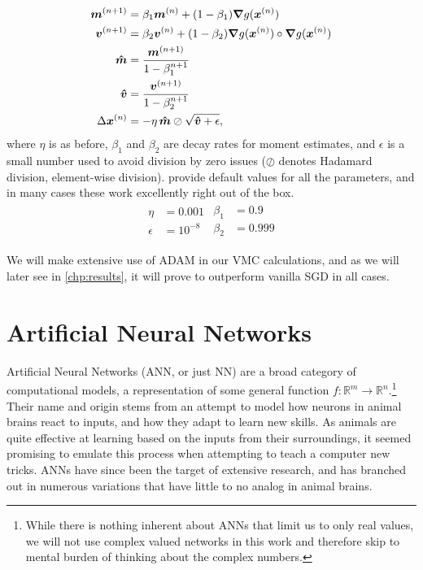 \documentclass[Thesis.tex]{subfiles}
\begin{document}
\begin{align}
  \bm{m}^{(n+1)} &= \beta_1 \bm{m}^{(n)} + (1 - \beta_1)\grad{g(\bm{x}^{(n)})}\\
  \bm{v}^{(n+1)} &= \beta_2 \bm{v}^{(n)} + (1 - \beta_2)\grad{g(\bm{x}^{(n)})}\circ\grad{g(\bm{x}^{(n)})}\\
  \bm{\hat m} &= \frac{\bm{m}^{(n+1)}}{1 - \beta_1^{n+1}}\\
  \bm{\hat v} &= \frac{\bm{v}^{(n+1)}}{1 - \beta_2^{n+1}}\\
  \Delta \bm{x}^{(n)}&= -\eta\, \bm{\hat m}\oslash\sqrt{\bm{\hat v} + \epsilon},
\end{align}
where $\eta$ is as before, $\beta_1$ and $\beta_2$ are decay rates for moment
estimates, and $\epsilon$ is a small number used to avoid division by zero
issues ($\oslash$ denotes Hadamard division, element-wise division). \textcite{KingmaB14} provide default values for all the parameters, and
in many cases these work excellently right out of the box.
\begin{align}
  \label{eq:adam-default-parameters}
  \begin{split}
    \eta &= 0.001\\
    \epsilon &= 10^{-8}
  \end{split}
  \begin{split}
    \beta_1 &= 0.9\\
    \beta_2 &= 0.999
  \end{split}
\end{align}

We will make extensive use of ADAM in our VMC calculations, and as we will later
see in \cref{chp:results}, it will prove to outperform vanilla SGD in all cases.


\section{Artificial Neural Networks}
\label{sec:artificial-neural-networks}

Artificial Neural Networks (ANN, or just NN) are a broad category of
computational models, a representation of some general function $f:
\mathbb{R}^m\to\mathbb{R}^n$.\footnote{While there is nothing inherent about
  ANNs that limit us to only real values, we will not use
  complex valued networks in this work and therefore skip to mental burden of
  thinking about the complex numbers.} Their name and origin stems from an attempt to
model how neurons in animal brains react to inputs, and how they adapt to learn
new skills. As animals are quite effective at learning based on the inputs from
their surroundings, it seemed promising to emulate this
process when attempting to teach a computer new tricks. ANNs have since been the
target of extensive research, and has branched out in numerous variations that
have little to no analog in animal brains.
\end{document}
